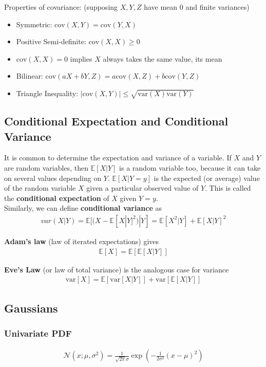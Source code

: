 \documentclass{harvardml}
\theoremstyle{definition}
\theoremstyle{plain}
\newcommand{\E}{\mathbb{E}}
\newcommand{\var}{\text{var}}
\newcommand{\cov}{\text{cov}}
\begin{document}
		\noindent Properties of covariance: (supposing $X,Y,Z$ have mean 0 
                  and finite variances)
		\begin{itemize}
            \item Symmetric: $\cov(X,Y) = \cov(Y,X)$
            \item Positive Semi-definite: $\cov(X,X) \geq 0$
            \item $\cov(X,X) = 0$ implies $X$ always takes the same value, 
				  its mean
            \item Bilinear: $\cov(aX + bY,Z) = a\cov(X,Z) + b\cov(Y,Z)$
            \item Triangle Inequality: $|\cov(X,Y)| \leq \sqrt{\var(X)\var(Y)}$
		\end{itemize}

	\subsection{Conditional Expectation and Conditional Variance}
		It is common to determine the expectation and variance of a variable. 
		If $X$ and $Y$ are random variables, then $\E[X|Y]$ is a random 
		variable too, because it can take on several values depending on $Y$. 
		$\E[X|Y=y]$ is the expected (or average) value of the random variable 
		$X$ given a particular observed value of $Y$. This is called the 
		\textbf{conditional expectation} of $X$ given $Y=y$.\\
	
		\noindent Similarly, we can define \textbf{conditional variance} as
		\begin{align*}
			var(X|Y) = \E[(X - \E[X|Y]^{2}) | Y] = \E[X^2|Y] + \E[X|Y]^2
		\end{align*}
		
		\noindent \textbf{Adam's law} (law of iterated expectations) gives
		\begin{align*}
			\E[X]=\E[\E[X|Y]]
		\end{align*}

		\noindent \textbf{Eve's Law} (or law of total variance) is the 
		analogous case for variance
		\begin{align*}
  			\var[X] = \E[ \var[X|Y] ] + \var[ \E[X | Y] ]
		\end{align*}



	\subsection{Gaussians}
		\subsubsection{Univariate PDF}
			\begin{align*}
				\mathcal{N}(x; \mu, \sigma^2) = 
				\frac{1}{\sqrt{2\pi}\sigma} 
				\exp\left( -\frac{1}{2\sigma^2} (x - \mu)^2 \right)
			\end{align*}
\end{document}
